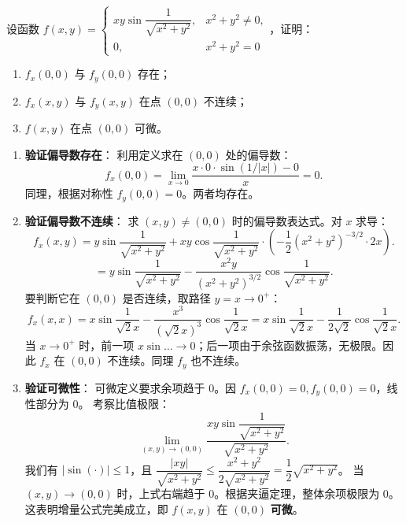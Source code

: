 \documentclass[lang=cn,11pt]{elegantbook}
\begin{document}
\begin{exercise}[偏导数不连续但可微的证明]
设函数 $f(x,y) = \begin{cases} xy\sin\dfrac{1}{\sqrt{x^2+y^2}}, & x^2+y^2 \neq 0, \\ 0, & x^2+y^2 = 0 \end{cases}$，证明：
\begin{enumerate}
  \item[(1)] $f_x(0,0)$ 与 $f_y(0,0)$ 存在；
  \item[(2)] $f_x(x,y)$ 与 $f_y(x,y)$ 在点 $(0,0)$ 不连续；
  \item[(3)] $f(x,y)$ 在点 $(0,0)$ 可微。
\end{enumerate}
\end{exercise}
\begin{solution}
\begin{enumerate}
  \item[(1)] \textbf{验证偏导数存在}：
  利用定义求在 $(0,0)$ 处的偏导数：
  \[
  f_x(0,0) = \lim_{x \to 0} \frac{x\cdot 0 \cdot \sin(1/|x|) - 0}{x} = 0.
  \]
  同理，根据对称性 $f_y(0,0) = 0$。两者均存在。
  
  \item[(2)] \textbf{验证偏导数不连续}：
  求 $(x,y) \neq (0,0)$ 时的偏导数表达式。对 $x$ 求导：
  \[
  f_x(x,y) = y\sin\frac{1}{\sqrt{x^2+y^2}} + xy\cos\frac{1}{\sqrt{x^2+y^2}} \cdot \left(-\frac{1}{2}(x^2+y^2)^{-3/2} \cdot 2x\right).
  \]
  \[
  = y\sin\frac{1}{\sqrt{x^2+y^2}} - \frac{x^2y}{(x^2+y^2)^{3/2}}\cos\frac{1}{\sqrt{x^2+y^2}}.
  \]
  要判断它在 $(0,0)$ 是否连续，取路径 $y=x \to 0^+$：
  \[
  f_x(x,x) = x\sin\frac{1}{\sqrt{2}x} - \frac{x^3}{(\sqrt{2}x)^3}\cos\frac{1}{\sqrt{2}x} = x\sin\frac{1}{\sqrt{2}x} - \frac{1}{2\sqrt{2}}\cos\frac{1}{\sqrt{2}x}.
  \]
  当 $x \to 0^+$ 时，前一项 $x\sin\dots \to 0$；后一项由于余弦函数振荡，无极限。因此 $f_x$ 在 $(0,0)$ 不连续。同理 $f_y$ 也不连续。
  
  \item[(3)] \textbf{验证可微性}：
  可微定义要求余项趋于 $0$。因 $f_x(0,0)=0, f_y(0,0)=0$，线性部分为 0。
  考察比值极限：
  \[
  \lim_{(x,y)\to(0,0)} \frac{xy\sin\dfrac{1}{\sqrt{x^2+y^2}}}{\sqrt{x^2+y^2}}.
  \]
  我们有 $|\sin(\cdot)| \le 1$，且 $\dfrac{|xy|}{\sqrt{x^2+y^2}} \le \dfrac{x^2+y^2}{2\sqrt{x^2+y^2}} = \dfrac{1}{2}\sqrt{x^2+y^2}$。
  当 $(x,y)\to(0,0)$ 时，上式右端趋于 $0$。根据夹逼定理，整体余项极限为 $0$。
  这表明增量公式完美成立，即 $f(x,y)$ 在 $(0,0)$ \textbf{可微}。
\end{enumerate}
\end{solution}
\end{document}
